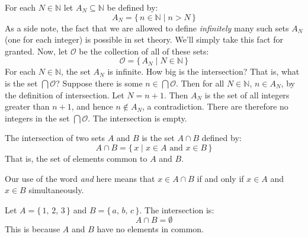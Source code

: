             \begin{example}
                For each $N\in\mathbb{N}$ let $A_{N}\subseteq\mathbb{N}$ be
                defined by:
                \begin{equation}
                    A_{N}=\{\,n\in\mathbb{N}\;|\;n>N\,\}
                \end{equation}
                As a side note, the fact that we are allowed to define
                \textit{infinitely} many such sets $A_{N}$ (one for each
                integer) is possible in set theory. We'll simply take this
                fact for granted. Now, let $\mathcal{O}$ be the collection
                of all of these sets:
                \begin{equation}
                    \mathcal{O}=\{\,A_{N}\;|\;N\in\mathbb{N}\,\}
                \end{equation}
                For each $N\in\mathbb{N}$, the set $A_{N}$ is infinite.
                How big is the intersection? That is, what is the set
                $\bigcap\mathcal{O}$? Suppose there is some
                $n\in\bigcap\mathcal{O}$. Then for all $N\in\mathbb{N}$,
                $n\in{A}_{N}$, by the definition of intersection.
                Let $N=n+1$. Then $A_{N}$ is the set of all integers
                greater than $n+1$, and hence $n\notin{A}_{N}$, a
                contradiction. There are therefore no integers in the
                set $\bigcap\mathcal{O}$. The intersection is empty.
            \end{example}
            \begin{definition}
                The intersection of two sets $A$ and $B$ is the set
                $A\cap{B}$ defined by:
                \begin{equation}
                    A\cap{B}=\{\,x\;|\;x\in{A}\textrm{ and }x\in{B}\,\}
                \end{equation}
                That is, the set of elements common to $A$ and $B$.
            \end{definition}
            Our use of the word \textit{and} here means that
            $x\in{A}\cap{B}$ if and only if $x\in{A}$ and $x\in{B}$
            simultaneously.
            \begin{example}
                Let $A=\{\,1,\,2,\,3\,\}$ and $B=\{\,a,\,b,\,c\,\}$. The
                intersection is:
                \begin{equation}
                    A\cap{B}=\emptyset
                \end{equation}
                This is because $A$ and $B$ have no elements in common.
            \end{example}
